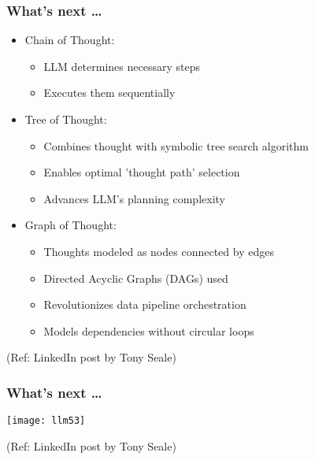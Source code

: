 \begin{frame}[fragile]\frametitle{What's next \ldots}

\begin{itemize}
\item Chain of Thought:
	\begin{itemize}
	\item LLM determines necessary steps
	\item Executes them sequentially
	\end{itemize}
	
\item Tree of Thought:
	\begin{itemize}
	\item Combines thought with symbolic tree search algorithm
	\item Enables optimal 'thought path' selection
	\item Advances LLM's planning complexity
	\end{itemize}
	
\item Graph of Thought:
	\begin{itemize}
	\item Thoughts modeled as nodes connected by edges
	\item Directed Acyclic Graphs (DAGs) used
	\item Revolutionizes data pipeline orchestration
	\item Models dependencies without circular loops
	\end{itemize}
	
\end{itemize}

{\tiny (Ref: LinkedIn post by Tony Seale)}

\end{frame}

\begin{frame}[fragile]\frametitle{What's next \ldots}

\begin{center}
\texttt{[image: llm53]}
\end{center}	

{\tiny (Ref: LinkedIn post by Tony Seale)}

	
\end{frame}



